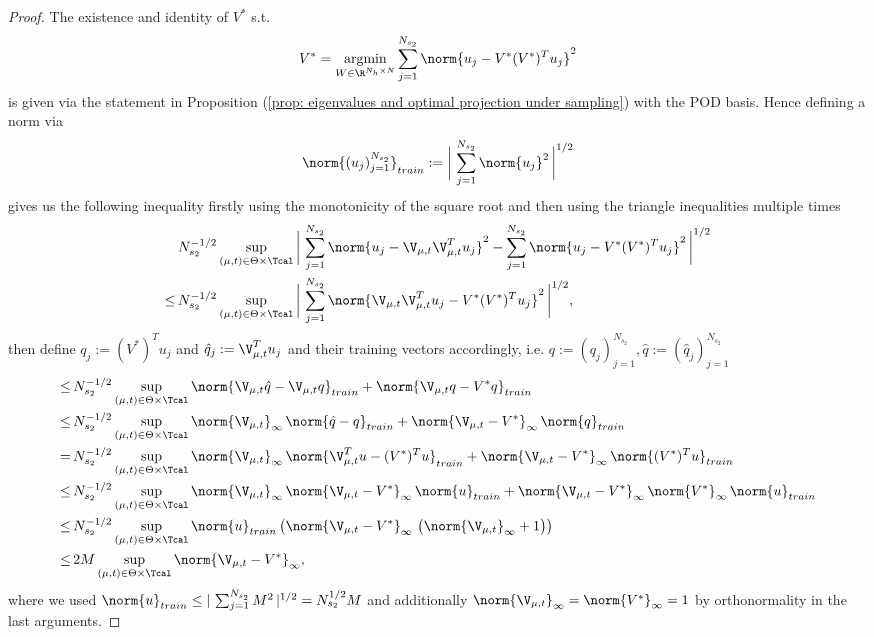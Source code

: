 \begin{proof}
    The existence and identity of $V^*$ s.t. 
    \begin{equation*}
        V^* = \underset{W \in \R^{N_h \times N}}{\operatorname{argmin}} \sum_{j=1}^{N_{s_2}}
        \norm{u_j - V^* (V^*)^T u_j}^2    
    \end{equation*}
    is given via the statement in Proposition (\ref{prop: eigenvalues and optimal projection under sampling}) with the POD basis.
    Hence defining a norm via 
    \begin{equation*}
        \norm{(u_j)_{j=1}^{N_{s_2}}}_{train} := \bigg\vert \, \sum_{j=1}^{N_{s_2}} \norm{u_j}^2 \, \bigg\vert^{1/2}
    \end{equation*}
    gives us the following inequality firstly using the monotonicity of the square root and then using the triangle inequalities multiple times
    \begin{align*}
        & \, N_{s_2}^{-1/2} \sup\limits_{(\mu, t) \in \Theta \times \Tcal} \bigg\vert \, \sum_{j=1}^{N_{s_2}} \norm{u_j - \V_{\mu, t} \V_{\mu, t}^T u_j}^2 
        - \sum_{j = 1}^{N_{s_2}} \norm{u_j - V^* (V^*)^T u_j}^2 \, \bigg\vert^{1/2} \\
        \leq& \, N_{s_2}^{-1/2} \sup\limits_{(\mu, t) \in \Theta \times \Tcal} \bigg\vert \, \sum_{j = 1}^{N_{s_2}} \norm{\V_{\mu, t} \V_{\mu, t}^T u_j - V^* (V^*)^T u_j}^2 \, \bigg\vert^{1/2}, 
    \end{align*}
    then define $q_j := (V^*)^T u_j$ and $\hat{q}_j := \V_{\mu, t}^T u_j$ and their training vectors accordingly, i.e. $q := (q_j)_{j=1}^{N_{s_2}}, \hat{q} := (\hat{q}_j)_{j=1}^{N_{s_2}}$
    \begin{align*}
        \leq& \, N_{s_2}^{-1/2} \sup\limits_{(\mu, t) \in \Theta \times \Tcal} \norm{\V_{\mu, t} \hat{q} - \V_{\mu, t} q}_{train} + \norm{\V_{\mu, t} q - V^* q}_{train} \\
        \leq& \, N_{s_2}^{-1/2} \sup\limits_{(\mu, t) \in \Theta \times \Tcal}  \norm{\V_{\mu, t}}_\infty \, \norm{\hat{q} - q}_{train} + \norm{\V_{\mu, t} - V^*}_\infty \, \norm{q}_{train} \\
        = & \, N_{s_2}^{-1/2} \sup\limits_{(\mu, t) \in \Theta \times \Tcal} \norm{\V_{\mu, t}}_\infty \, \norm{\V_{\mu, t}^T u - (V^*)^T u}_{train} + \norm{\V_{\mu, t} - V^*}_\infty \, \norm{(V^*)^T u}_{train} \\
        \leq& \, N_{s_2}^{-1/2}  \sup\limits_{(\mu, t) \in \Theta \times \Tcal} \norm{\V_{\mu, t}}_\infty \, \norm{\V_{\mu, t} - V^*}_\infty \, \norm{u}_{train} + \norm{\V_{\mu, t} - V^*}_\infty \, \norm{V^*}_\infty \, \norm{u}_{train} \\
        \leq& \, N_{s_2}^{-1/2}  \sup\limits_{(\mu, t) \in \Theta \times \Tcal} \norm{u}_{train} \left( \norm{\V_{\mu, t} - V^*}_\infty \, \left( \norm{\V_{\mu, t}}_\infty + 1 \right) \right) \\
        \leq& \, 2 M \sup\limits_{(\mu, t) \in \Theta \times \Tcal} \norm{\V_{\mu, t} - V^*}_\infty,
    \end{align*}
    where we used $\norm{u}_{train} \leq \vert \, \sum_{j=1}^{N_{s_2}} M^2 \, \vert^{1/2} = N_{s_2}^{1/2} M$ and additionally $\norm{\V_{\mu, t}}_\infty = \norm{V^*}_\infty = 1$
    by orthonormality in the last arguments.


\end{proof}
